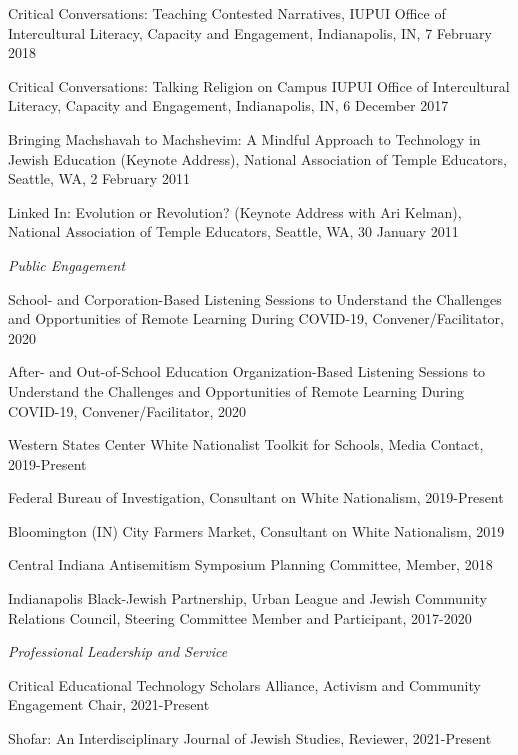 \documentclass[11pt,article,oneside]{memoir}
\begin{document}
\ind Critical Conversations: Teaching Contested Narratives, IUPUI Office of Intercultural Literacy, Capacity and Engagement, Indianapolis, IN, 7 February 2018

\ind Critical Conversations: Talking Religion on Campus	IUPUI Office of Intercultural Literacy, Capacity and Engagement, Indianapolis, IN, 6 December 2017

\ind Bringing Machshavah to Machshevim: A Mindful Approach to Technology in Jewish Education (Keynote Address),	National Association of Temple Educators, Seattle, WA, 2 February 2011

\ind Linked In: Evolution or Revolution? (Keynote Address with Ari Kelman), National Association of Temple Educators, Seattle, WA, 30 January 2011


\medskip

\noindent\emph{Public Engagement \vspace{0.01in}}

\ind School- and Corporation-Based Listening Sessions to Understand the Challenges and Opportunities of Remote Learning During COVID-19, Convener/Facilitator, 2020

\ind After- and Out-of-School Education Organization-Based Listening Sessions to Understand the Challenges and Opportunities of Remote Learning During COVID-19, Convener/Facilitator, 2020

\ind Western States Center White Nationalist Toolkit for Schools, Media Contact, 2019-Present

\ind Federal Bureau of Investigation, Consultant on White Nationalism, 2019-Present

\ind Bloomington (IN) City Farmers Market, Consultant on White Nationalism, 2019

\ind Central Indiana Antisemitism Symposium Planning Committee, Member, 2018

\ind Indianapolis Black-Jewish Partnership, Urban League and Jewish Community Relations Council, Steering Committee Member and Participant, 2017-2020

\medskip

\noindent\emph{Professional Leadership and Service \vspace{0.01in}}

\ind Critical Educational Technology Scholars Alliance, Activism and Community Engagement Chair, 2021-Present

\ind Shofar: An Interdisciplinary Journal of Jewish Studies, Reviewer, 2021-Present
\end{document}
